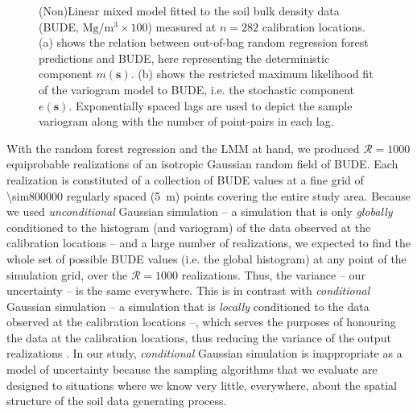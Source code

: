 \begin{figure}[!ht]
\begin{minipage}{0.60\textwidth}
 \end{minipage}
 \caption[(Non)Linear mixed model fitted to the soil bulk density data.]{(Non)Linear mixed model fitted to the 
 soil bulk density data (BUDE, $\si{\mega\gram\per\cubic\metre} \times 100$) measured at $n = 282$ 
calibration locations. (a) shows the relation between out-of-bag random regression forest predictions and BUDE, 
here representing the deterministic component $m(\boldsymbol{s})$. (b) shows the restricted maximum likelihood 
fit of the variogram model to BUDE, i.e. the stochastic component $e(\boldsymbol{s})$. Exponentially spaced 
lags are used to depict the sample variogram along with the number of point-pairs in each lag.}
 \label{fig:chap08-bude-vario}
\end{figure}

With the random forest regression and the LMM at hand, we produced $\mathcal{R} = 1000$ equiprobable 
realizations of an isotropic Gaussian random field of BUDE. Each realization is constituted of a collection of 
BUDE values at a fine grid of \num{\sim800000} regularly spaced (\SI{5}{\metre}) points covering the entire 
study area. Because we used \emph{unconditional} Gaussian simulation -- a simulation that is only 
\emph{globally} conditioned to the histogram (and variogram) of the data observed at the calibration locations 
\cite{Goovaerts1997} -- and a large number of realizations, we expected to find the whole set of possible BUDE 
values (i.e. the global histogram) at any point of the simulation grid, over the $\mathcal{R} = 1000$ 
realizations. Thus, the variance -- our uncertainty -- is the same everywhere. This is in contrast with 
\emph{conditional} Gaussian simulation -- a simulation that is \emph{locally} conditioned to the data observed 
at the calibration locations --, which serves the purposes of honouring the data at the calibration locations, 
thus reducing the variance of the output realizations \cite{Goovaerts1997}. In our study, \emph{conditional} 
Gaussian simulation is inappropriate as a model of uncertainty because the sampling algorithms that we evaluate 
are designed to situations where we know very little, everywhere, about the spatial structure of the soil data 
generating process.

